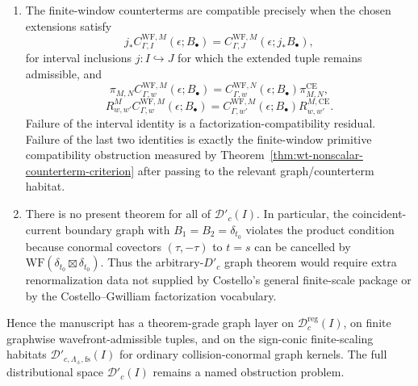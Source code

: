 \begin{prop}
\begin{enumerate}
\[      \max\{-1,\,
      \lfloor s_{\Gamma,\alpha,\Delta}-c_\Delta\rfloor\}.
    \]
    If \(\widetilde T\) and \(\widetilde T'\) are two local extensions
    of \(T^M_{\Gamma,\alpha}(B_\bullet)\) across \(\Delta\), then locally
    in normal coordinates to \(\Delta\)
    \[
      \widetilde T'-\widetilde T
        =
      \sum_{|\beta|\leq N_{\Gamma,\alpha,\Delta}}
      \partial_\nu^\beta\delta_\Delta\otimes
      S_{\Delta,\beta},
    \]
    with no summand when \(N_{\Gamma,\alpha,\Delta}=-1\).  Here
    \(S_{\Delta,\beta}\in\mathcal D'(\Delta)\) is supported in
    \(\Delta\cap\operatorname{supp}(B_\Gamma)\) and carries the same
    finite-window Hamiltonian coefficient label.  Thus the allowed
    counterterm ambiguity belongs to
    \[
      \sum_{\Delta,\alpha}
      \sum_{|\beta|\leq N_{\Gamma,\alpha,\Delta}}
      \partial_\nu^\beta\delta_\Delta\,
      \mathcal D'_{\Delta\cap\operatorname{supp}(B_\Gamma)}(\Delta)
      \widehat\otimes
      A_{\partial,\hbar}^{\mathrm{pp},w,M}(I).
    \]
    \item The finite-window counterterms are compatible precisely when
    the chosen extensions satisfy
    \[
      j_*C_{\Gamma,I}^{\mathrm{WF},M}(\epsilon;B_\bullet)
        =
      C_{\Gamma,J}^{\mathrm{WF},M}(\epsilon;j_*B_\bullet),
    \]
    for interval inclusions \(j:I\hookrightarrow J\) for which the
    extended tuple remains admissible, and
    \[
      \pi_{M,N}C_{\Gamma,w}^{\mathrm{WF},M}(\epsilon;B_\bullet)
        =
      C_{\Gamma,w}^{\mathrm{WF},N}(\epsilon;B_\bullet)
        \pi^{\mathrm{CE}}_{M,N},
    \]
    \[
      R^M_{w,w'}C_{\Gamma,w}^{\mathrm{WF},M}(\epsilon;B_\bullet)
        =
      C_{\Gamma,w'}^{\mathrm{WF},M}(\epsilon;B_\bullet)
        R^{M,\mathrm{CE}}_{w,w'} .
    \]
    Failure of the interval identity is a factorization-compatibility
    residual.  Failure of the last two identities is exactly the
    finite-window primitive compatibility obstruction measured by
    Theorem~\ref{thm:wt-nonscalar-counterterm-criterion} after passing to
    the relevant graph/counterterm habitat.
    \item There is no present theorem for all of
    \(\mathcal D'_c(I)\).  In particular, the coincident-current
    boundary graph with
    \(B_1=B_2=\delta_{t_0}\) violates the product condition because
    conormal covectors \((\tau,-\tau)\) to \(t=s\) can be cancelled by
    \(\mathrm{WF}(\delta_{t_0}\boxtimes\delta_{t_0})\).  Thus the
    arbitrary-\(D'_c\) graph theorem would require extra renormalization
    data not supplied by Costello's general finite-scale package or by
    the Costello--Gwilliam factorization vocabulary.
  \end{enumerate}
  Hence the manuscript has a theorem-grade graph layer on
  \(\mathcal D^{\mathrm{reg}}_c(I)\), on finite graphwise
  wavefront-admissible tuples, and on the sign-conic finite-scaling
  habitats \(\mathcal D'_{c,\Lambda_\pm,\mathrm{fs}}(I)\) for ordinary
  collision-conormal graph kernels.  The full distributional space
  \(\mathcal D'_c(I)\) remains a named obstruction problem.
\end{prop}

